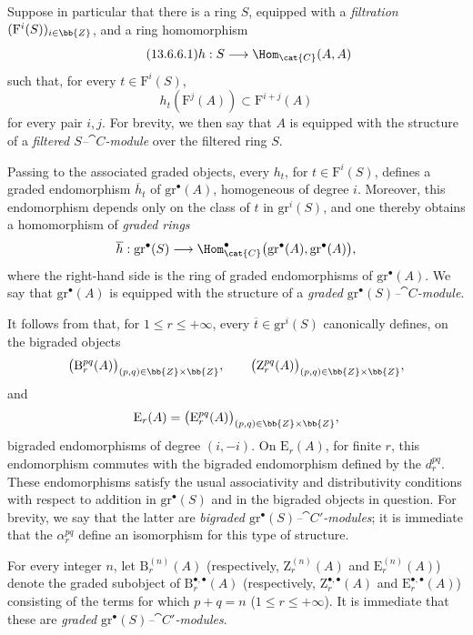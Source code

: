 \begin{env}[13.6.6]
\label{0.13.6.6}
Suppose in particular that there is a ring $S$, equipped with a
\emph{filtration} $(\mathrm{F}^i(S))_{i\in\bb{Z}}$, and a ring
homomorphism
\begin{equation}
\label{0.13.6.6.1}
\tag{13.6.6.1}
  h:S\longrightarrow\Hom_{\cat{C}}(A,A)
\end{equation}
such that, for every $t\in\mathrm{F}^i(S)$,
\[
  h_t(\mathrm{F}^j(A))
  \subset
  \mathrm{F}^{i+j}(A)
\]
for every pair $i,j$.
For brevity, we then say that $A$ is equipped with the structure of a
\emph{filtered $S$--$\cat{C}$-module} over the filtered ring $S$.

Passing to the associated graded objects, every $h_t$, for
$t\in\mathrm{F}^i(S)$, defines a graded endomorphism
$\overline{h}_t$ of $\mathrm{gr}^\bullet(A)$, homogeneous of degree
$i$.
Moreover, this endomorphism depends only on the class of $t$ in
$\mathrm{gr}^i(S)$, and one thereby obtains a homomorphism of
\emph{graded rings}
\[
  \overline{h}:
  \mathrm{gr}^\bullet(S)
  \longrightarrow
  \Hom_{\cat{C}}^\bullet
  \bigl(\mathrm{gr}^\bullet(A),\mathrm{gr}^\bullet(A)\bigr),
\]
where the right-hand side is the ring of graded endomorphisms of
$\mathrm{gr}^\bullet(A)$.
We say that $\mathrm{gr}^\bullet(A)$ is equipped with the structure
of a \emph{graded $\mathrm{gr}^\bullet(S)$--$\cat{C}$-module}.

It follows from  that, for
$1\leq r\leq+\infty$, every
$\overline{t}\in\mathrm{gr}^i(S)$ canonically defines, on the
bigraded objects
\[
  \bigl(\mathrm{B}_r^{pq}(A)\bigr)_{(p,q)\in\bb{Z}\times\bb{Z}},
  \qquad
  \bigl(\mathrm{Z}_r^{pq}(A)\bigr)_{(p,q)\in\bb{Z}\times\bb{Z}},
\]
and
\[
  \mathrm{E}_r(A)
  =
  \bigl(\mathrm{E}_r^{pq}(A)\bigr)_{(p,q)\in\bb{Z}\times\bb{Z}},
\]
bigraded endomorphisms of degree $(i,-i)$.
On $\mathrm{E}_r(A)$, for finite $r$, this endomorphism commutes with
the bigraded endomorphism defined by the $d_r^{pq}$.
These endomorphisms satisfy the usual associativity and
distributivity conditions with respect to addition in
$\mathrm{gr}^\bullet(S)$ and in the bigraded objects in question.
For brevity, we say that the latter are
\emph{bigraded $\mathrm{gr}^\bullet(S)$--$\cat{C}'$-modules};
it is immediate that the $\alpha_r^{pq}$ define an isomorphism for
this type of structure.

For every integer $n$, let $\mathrm{B}_r^{(n)}(A)$
(respectively, $\mathrm{Z}_r^{(n)}(A)$ and
$\mathrm{E}_r^{(n)}(A)$) denote the graded subobject of
$\mathrm{B}_r^{\bullet,\bullet}(A)$
(respectively, $\mathrm{Z}_r^{\bullet,\bullet}(A)$ and
$\mathrm{E}_r^{\bullet,\bullet}(A)$) consisting of the terms for
which $p+q=n$ ($1\leq r\leq+\infty$).
It is immediate that these are
\emph{graded $\mathrm{gr}^\bullet(S)$--$\cat{C}'$-modules}.


\end{env}
